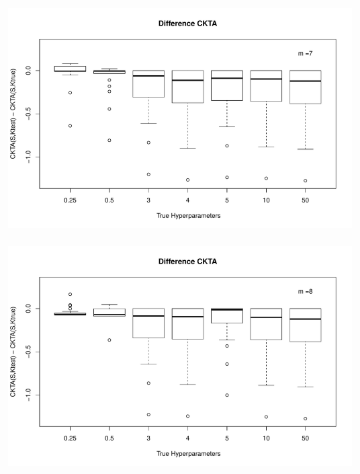 \documentclass[11pt, a4paper]{article} %
\begin{document}
\begin{landscape}
\begin{figure}
\begin{subfigure}{\textwidth}
  \centering
  \includegraphics[width=.8\linewidth]{dif_ckta_m_7.pdf}
  \label{fig:sfig1}
\end{subfigure}%
\begin{subfigure}{\textwidth}
  \centering
  \includegraphics[width=.8\linewidth]{dif_ckta_m_8.pdf}
  \label{fig:sfig1}
\end{subfigure}


\label{fig1}
\end{figure}

\end{landscape}

\restoregeometry
\end{document}
